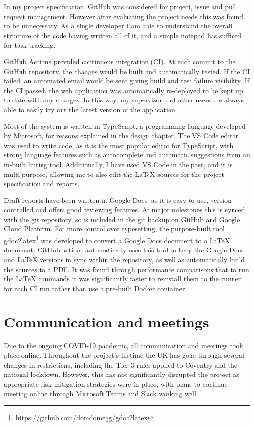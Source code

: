 \documentclass[a4paper,fleqn,oneside,12pt]{report}
\begin{document}
In my project specification, GitHub was considered for project, issue and pull request management. However after evaluating the project needs this was found to be unnecessary. As a single developer I am able to understand the overall structure of the code having written all of it, and a simple notepad has sufficed for task tracking.

GitHub Actions provided continuous integration (CI). At each commit to the GitHub repository, the changes would be built and automatically tested. If the CI failed, an automated email would be sent giving build and test failure visibility. If the CI passed, the web application was automatically re-deployed to be kept up to date with any changes. In this way, my supervisor and other users are always able to easily try out the latest version of the application.

Most of the system is written in TypeScript, a programming language developed by Microsoft, for reasons explained in the design chapter. The VS Code editor was used to write code, as it is the most popular editor for TypeScript, with strong language features such as autocomplete and automatic suggestions from an in-built linting tool. Additionally, I have used VS Code in the past, and it is multi-purpose, allowing me to also edit the LaTeX sources for the project specification and reports.

Draft reports have been written in Google Docs, as it is easy to use, version-controlled and offers good reviewing features. At major milestones this is synced with the git repository, so is included in the git backup on GitHub and Google Cloud Platform. For more control over typesetting, the purpose-built tool gdoc2latex\footnote{\href{https://github.com/domdomegg/gdoc2latex}{https://github.com/domdomegg/gdoc2latex}} was developed to convert a Google Docs document to a LaTeX document. GitHub actions automatically uses this tool to keep the Google Docs and LaTeX versions in sync within the repository, as well as automatically build the sources to a PDF. It was found through performance comparisons that to run the LaTeX commands it was significantly faster to reinstall them to the runner for each CI run rather than use a pre-built Docker container.

\section{Communication and meetings}\label{id:h.k8ippxnoat7q}

Due to the ongoing COVID-19 pandemic, all communication and meetings took place online. Throughout the project’s lifetime the UK has gone through several changes in restrictions, including the Tier 3 rules applied to Coventry and the national lockdown. However, this has not significantly disrupted the project as appropriate risk-mitigation strategies were in place, with plans to continue meeting online through Microsoft Teams and Slack working well.
\end{document}

